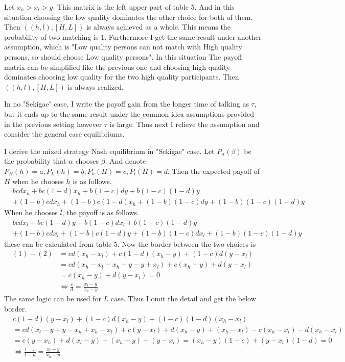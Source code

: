 \documentclass{article}
\begin{document}
	\par
	Let $x_h > x_l > y$.
	This matrix is the left upper part of table 5. And in this situation choosing the low quality dominates the other choice for both of them. Then $((h, l), [H, L])$ is always achieved as a whole. This means the probability of two matching is 1. Furthermore I get the same result under another assumption, which is "Low quality persons can not match with High quality persons, so should choose Low quality persons". In this situation The payoff matrix can be simplified like the previous one and choosing high quality dominates choosing low quality for the two high quality participants. Then $((h, l), [H, L])$ is always realized.
	\par
	In no "Sekigae" case, I write the payoff gain from the longer time of talking as $\tau$, but it ends up to the same result under the common idea assumptions provided in the previous setting however $\tau$ is large. Thus next I relieve the assumption and consider the general case equilibriums.
	\par
	I derive the mixed strategy Nash equilibrium in "Sekigae" case. Let $P_\alpha(\beta)$ be the probability that $\alpha$ chooses $\beta$. And denote $P_H(h) = a, P_L(h) = b, P_h(H) = c, P_l(H) = d$. Then the expected payoff of $H$ when he chooses $h$ is as follows. 
	\begin{align}
	&bcdx_h + bc(1-d)x_h + b(1-c)dy + b(1-c)(1-d)y \nonumber \\&+ (1-b)cdx_h + (1-b)c(1-d)x_h + (1-b)(1-c)dy + (1-b)(1-c)(1-d)y
	\end{align}
	When he chooses $l$, the payoff is as follows.
	\begin{align}
	&bcdx_l + bc(1-d)y + b(1-c)dx_l + b(1-c)(1-d)y \nonumber \\&+ (1-b)cdx_l + (1-b)c(1-d)y + (1-b)(1-c)dx_l + (1-b)(1-c)(1-d)y
	\end{align}
	these can be calculated from table 5. Now the border between the two choices is 
	\begin{align}
	(1) - (2) &=  cd(x_h - x_l) + c(1-d)(x_h - y) + (1-c)d(y - x_l) \nonumber \\
	&= cd(x_h - x_l - x_h + y -y + x_l) + c(x_h - y) + d(y - x_l) \nonumber\\
	&= c(x_h - y) + d(y - x_l) = 0 \nonumber\\
	&\Leftrightarrow \frac{c}{d} = \frac{x_l - y}{x_h - y}
	\end{align}
	The same logic can be used for $L$ case. Thus I omit the detail and get the below border.
	\begin{align}
	&c(1 - d)(y - x_l) + (1 - c)d(x_h - y) + (1-c)(1-d)(x_h - x_l) \nonumber \\
	&= cd(x_l - y + y -x_h + x_h - x_l) + c(y - x_l) + d(x_h - y) + (x_h - x_l) - c(x_h - x_l) - d(x_h - x_l)\nonumber \\
	&= c(y - x_h) + d(x_l - y) + (x_h - y) + (y - x_l) = (x_h - y)(1 - c) + (y - x_l)(1 - d) = 0 \nonumber \\
	&\Leftrightarrow \frac{1-c}{1-d} = \frac{x_l - y}{x_h - y}
	\end{align}
\end{document}
